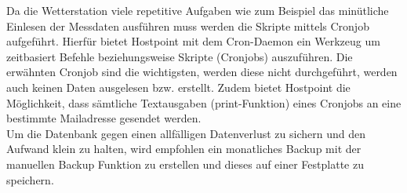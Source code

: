\documentclass[10pt]{article}
\begin{document}
\begin{multicols}{2}
Da die Wetterstation viele repetitive Aufgaben wie zum Beispiel das minütliche Einlesen der Messdaten ausführen muss werden die Skripte mittels Cronjob aufgeführt. Hierfür  bietet Hostpoint mit dem Cron-Daemon ein Werkzeug um zeitbasiert Befehle beziehungsweise Skripte (Cronjobs) auszuführen. Die erwähnten Cronjob sind die wichtigsten, werden diese nicht durchgeführt, werden auch keinen Daten ausgelesen bzw. erstellt. Zudem bietet Hostpoint die Möglichkeit, dass sämtliche Textausgaben (print-Funktion) eines Cronjobs an eine bestimmte Mailadresse gesendet werden.\\
Um die Datenbank gegen einen allfälligen Datenverlust zu sichern und den Aufwand klein zu halten, wird empfohlen ein monatliches Backup mit der manuellen Backup Funktion zu erstellen und dieses auf einer Festplatte zu speichern. 




\end{multicols}
\end{document}
